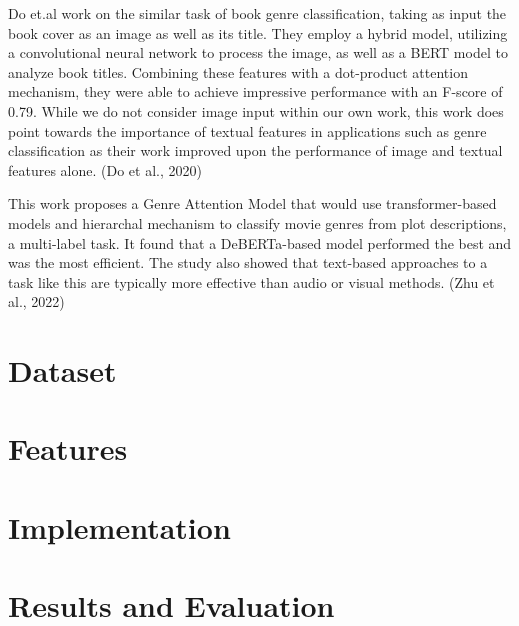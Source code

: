 \documentclass[11pt]{article}
\begin{document}
Do et.al work on the similar task of book genre classification, taking as input the book cover as an image as well as its title. They employ a hybrid model, utilizing a convolutional neural network to process the image, as well as a BERT model to analyze book titles. Combining these features with a dot-product attention mechanism, they were able to achieve impressive performance with an F-score of 0.79. While we do not consider image input within our own work, this work does point towards the importance of textual features in applications such as genre classification as their work improved upon the performance of image and textual features alone. (Do et al., 2020)

This work proposes a Genre Attention Model that would use transformer-based models and hierarchal mechanism to classify movie genres from plot descriptions, a multi-label task. It found that a DeBERTa-based model performed the best and was the most efficient. The study also showed that text-based approaches to a task like this are typically more effective than audio or visual methods. (Zhu et al., 2022)



\section{Dataset}


\section{Features}







\section{Implementation}







\section{Results and Evaluation}
\end{document}
